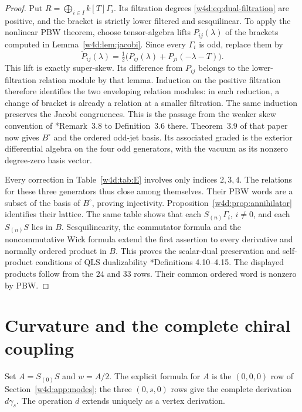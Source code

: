\begin{proof}
Put $R=\bigoplus_{i\in I}k[T]\Gamma_i$. Its filtration degrees
\eqref{w4d:eq:dual-filtration} are positive, and the bracket is strictly
lower filtered and sesquilinear. To apply the nonlinear PBW theorem,
choose tensor-algebra lifts $P_{ij}(\lambda)$ of the brackets computed
in Lemma~\ref{w4d:lem:jacobi}. Since every $\Gamma_i$ is odd, replace them by
\[
 \widetilde P_{ij}(\lambda)
 =\tfrac12\bigl(P_{ij}(\lambda)+P_{ji}(-\lambda-T)\bigr).
\]
This lift is exactly super-skew. Its difference from $P_{ij}$ belongs
to the lower-filtration relation module by that lemma. Induction on
the positive filtration therefore identifies the two enveloping
relation modules: in each reduction, a change of bracket is already a
relation at a smaller filtration. The same induction preserves the
Jacobi congruences. This is the passage from the weaker skew convention
of \cite{wdr:DSK}*{Remark~3.8} to Definition~3.6 there.
Theorem~3.9 of that paper now gives $B^\circ$ and the ordered odd-jet
basis. Its associated graded is the exterior differential algebra on
the four odd generators, with the vacuum as its nonzero degree-zero
basis vector.

Every correction in Table~\ref{w4d:tab:E} involves only indices $2,3,4$. The relations for these three generators thus close among themselves. Their PBW words are a subset of the basis of $B^\circ$, proving injectivity. Proposition~\ref{w4d:prop:annihilator} identifies their lattice. The same table shows that each $S_{(n)}\Gamma_i$, $i\ne0$, and each $S_{(n)}S$ lies in $B$. Sesquilinearity, the commutator formula and the noncommutative Wick formula extend the first assertion to every derivative and normally ordered product in $B$. This proves the scalar-dual preservation and self-product conditions of QLS dualizability \cite{kdx:GLZ}*{Definitions 4.10--4.15}. The displayed products follow from the $24$ and $33$ rows. Their common ordered word is nonzero by PBW.
\end{proof}

\section{Curvature and the complete chiral coupling}\label{w4d:sec:curvature}
Set $A=S_{(0)}S$ and $w=A/2$. The explicit formula for $A$ is the $(0,0,0)$ row of Section~\ref{w4d:app:modes}; the three $(0,s,0)$ rows give the complete derivation $d\gamma_s$. The operation $d$ extends uniquely as a vertex derivation.


